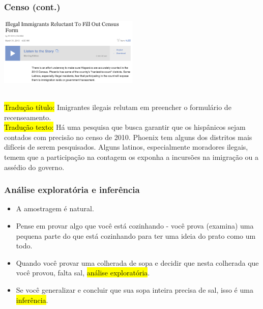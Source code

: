 \begin{frame}
\frametitle{Censo (cont.)}
\vfill

\begin{center}
\includegraphics[width=0.50\textwidth]{1-3_data_collection_principles/figures/census_illegal_immig.png}
\end{center}

\\


\justifying
\small{
\hl{Tradução título:} Imigrantes ilegais relutam em preencher o formulário de recenseamento.\\
\justifying
\hl{Tradução texto:} Há uma pesquisa que busca  garantir que os hispânicos sejam contados com precisão no censo de 2010. Phoenix tem alguns dos distritos mais difíceis de serem pesquisados. Alguns latinos, especialmente moradores ilegais, temem que a participação na contagem os exponha a incursões na imigração ou a assédio do governo.}
\end{frame}


\begin{frame}
\frametitle{Análise exploratória e inferência}

\begin{itemize}

\item A amostragem é natural.

\pause

\justifying
\item Pense em provar algo que você está cozinhando - você prova (examina) uma pequena parte do que está cozinhando para ter uma ideia do prato como um todo.

\pause

\justifying
\item Quando você provar uma colherada de sopa e decidir que nesta colherada que você provou, falta sal, \hl{análise exploratória}.

\pause

\justifying
\item Se você generalizar e concluir que sua sopa inteira precisa de sal, isso é uma \hl{inferência}.

\pause
\end{itemize}

\end{frame}

